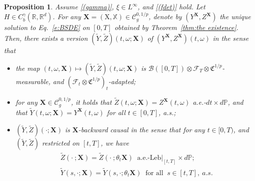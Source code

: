 \documentclass[11pt,reqno]{amsart}
\newtheorem{proposition}[lemma]{Proposition}
\newcommand{\BX}{{\mathbf{X}}}
\newcommand{\MF}{{\mathcal{F}}}
\numberwithin{equation}{section}
\def\R{\mathbb R}
\begin{document}
\begin{proposition}\label{prop:measurability of Y^X}
Assume \ref{(gamma)}, $\xi \in L^{\infty}$, and \ref{(fdet)} hold. Let $H \in C^{\gamma}_b (\R,\R^d)$. For any $\mathbf X = (\mathrm X,\mathbb X) \in \mathscr C^{0,1/p}_{g}$, denote by $(Y^{\mathbf X},Z^{\mathbf X})$ the unique solution to Eq.~\eqref{e:BSDE} on $[0,T]$ obtained by Theorem~\ref{thm:the existence}. Then, there exists a version $(\tilde Y,\tilde Z )(t,\omega;\mathbf X)$ of $(Y^{\mathbf X},Z^{\mathbf X})(t,\omega)$ in the sense that
\begin{itemize}
\item[(1)] the map $(t,\omega,\mathbf X) \mapsto (\tilde Y,\tilde Z )(t,\omega; \mathbf X)$ is $\mathcal B([0,T]) \otimes \MF_T \otimes \mathfrak C^{1/p}$-measurable, and $(\MF_t  \otimes \mathfrak C^{1/p} )_t$-adapted; 
\vspace{1mm}
\item[(2)] for any $\mathbf X \in \mathscr C^{0,1/p}_{g}$, it holds that $\tilde Z(t,\omega;\mathbf X) = Z^{\mathbf X}(t,\omega)$ a.e.-$dt \times d\mathbb P$, and that $\tilde Y(t,\omega;\mathbf X) = Y^{\mathbf X}(t,\omega)$ for all $t\in[0,T]$, a.s.;
\vspace{1mm}
\item[(3)] $(\tilde Y ,\tilde Z )(\cdot;{ \mathbf X})$ is $\BX$-{\it backward causal} in the sense that for any $t\in [0,T)$, and $(\tilde Y,\tilde Z)$ restricted on $[t,T]$, we have
\begin{equation*}
\begin{split}
&\tilde Z ( \cdot \ ;\mathbf X) =  \tilde Z ( \cdot \ ;\theta_t\mathbf X ) \  \text{ a.e.-Leb}|_{[t,T]} \times d\mathbb P;\\
&\tilde Y(s,\cdot; \mathbf X) = \tilde Y (s,\cdot; \theta_t\mathbf X )\  \text{ for all }\  s\in[t,T], \ a.s.   
\end{split}
\end{equation*}
\end{itemize}
\end{proposition}
\end{document}
